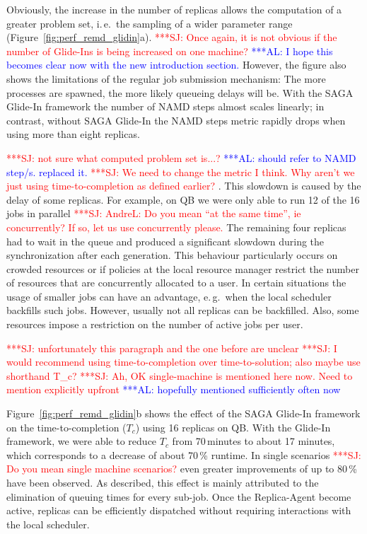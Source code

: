 \documentclass{rspublic}
\newcommand{\alnote}[1]{ {\textcolor{blue} { ***AL: #1 }}}
\newcommand{\jhanote}[1]{ {\textcolor{red} { ***SJ: #1 }}}
\newcommand{\alnote}[1]{}
\newcommand{\jhanote}[1]{}
\begin{document}
Obviously, the increase in the number of replicas allows the
computation of a greater problem set, i.\,e.\ the sampling of a wider
parameter range (Figure~\ref{fig:perf_remd_glidin}a).  \jhanote{Once
  again, it is not obvious if the number of Glide-Ins is being
  increased on one machine?}  \alnote{I hope this becomes clear now
  with the new introduction section.}  However, the figure also shows
the limitations of the regular job submission mechanism: The more
processes are spawned, the more likely queueing delays will be.  With
the SAGA Glide-In framework the number of NAMD steps almost scales
linearly; in contrast, without SAGA Glide-In the NAMD steps metric
rapidly drops when using more than eight replicas.

\jhanote{not sure what computed problem set is...?}  \alnote{should
  refer to NAMD step/s. replaced it.}  \jhanote{We need to change the
  metric I think. Why aren't we just using time-to-completion as
  defined earlier?}. This slowdown is caused by the delay of some
replicas.  For example, on QB we were only able to run 12 of the 16
jobs in parallel \jhanote{AndreL: Do you mean ``at the same time'', ie
  concurrently? If so, let us use concurrently please.}  The remaining
four replicas had to wait in the queue and produced a significant
slowdown during the synchronization after each generation.  This
behaviour particularly occurs on crowded resources or if policies at
the local resource manager restrict the number of resources that are
concurrently allocated to a user.  In certain situations the usage of
smaller jobs can have an advantage, e.\,g.\ when the local scheduler
backfills such jobs. However, usually not all replicas can be
backfilled. Also, some resources impose a restriction on the number of
active jobs per user.

\jhanote{unfortunately this paragraph and the one before are unclear}
\jhanote{I would recommend using time-to-completion over
  time-to-solution; also maybe use shorthand T\_c?}  \jhanote{Ah, OK
  single-machine is mentioned here now. Need to mention explicitly
  upfront} \alnote{hopefully mentioned sufficiently often now}

Figure~\ref{fig:perf_remd_glidin}b shows the effect of the SAGA
Glide-In framework on the time-to-completion ($T_{c}$) using 16
replicas on QB.  With the Glide-In framework, we were able to reduce
$T_{c}$ from 70\,minutes to about 17 minutes, which corresponds to a
decrease of about 70\,\% runtime.  In single scenarios \jhanote{Do you
  mean single machine scenarios?} even greater improvements of up to
80\,\% have been observed. As described, this effect is mainly
attributed to the elimination of queuing times for every sub-job. Once
the Replica-Agent become active, replicas can be efficiently
dispatched without requiring interactions with the local scheduler.
\end{document}
